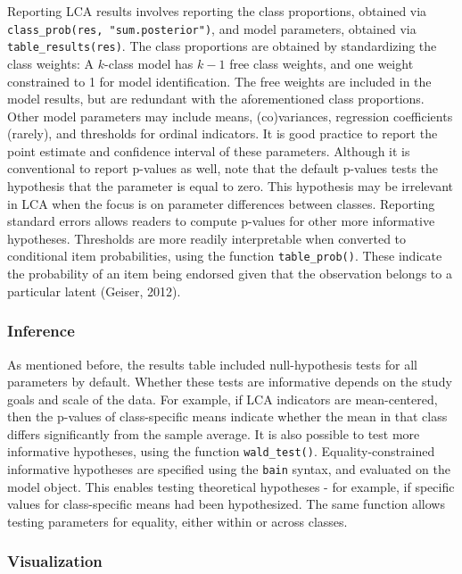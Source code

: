 \documentclass[
  ,man,floatsintext]{apa6}
\begin{document}
Reporting LCA results involves reporting the class proportions, obtained
via \texttt{class\_prob(res,\ "sum.posterior")}, and model parameters, obtained
via \texttt{table\_results(res)}. The class proportions are obtained by
standardizing the class weights: A \(k\)-class model has \(k-1\) free class
weights, and one weight constrained to 1 for model identification. The
free weights are included in the model results, but are redundant with
the aforementioned class proportions. Other model parameters may include
means, (co)variances, regression coefficients (rarely), and thresholds
for ordinal indicators. It is good practice to report the point estimate
and confidence interval of these parameters. Although it is conventional
to report p-values as well, note that the default p-values tests the
hypothesis that the parameter is equal to zero. This hypothesis may be
irrelevant in LCA when the focus is on parameter differences between
classes. Reporting standard errors allows readers to compute p-values
for other more informative hypotheses. Thresholds are more readily
interpretable when converted to conditional item probabilities, using
the function \texttt{table\_prob()}. These indicate the probability of an item
being endorsed given that the observation belongs to a particular latent
(Geiser, 2012).

\hypertarget{inference}{%
\subsubsection{Inference}\label{inference}}

As mentioned before, the results table included null-hypothesis tests
for all parameters by default. Whether these tests are informative
depends on the study goals and scale of the data. For example, if LCA
indicators are mean-centered, then the p-values of class-specific means
indicate whether the mean in that class differs significantly from the
sample average. It is also possible to test more informative hypotheses,
using the function \texttt{wald\_test()}. Equality-constrained informative
hypotheses are specified using the \texttt{bain} syntax, and evaluated on the
model object. This enables testing theoretical hypotheses - for example,
if specific values for class-specific means had been hypothesized. The
same function allows testing parameters for equality, either within or
across classes.

\hypertarget{visualization}{%
\subsubsection{Visualization}\label{visualization}}
\end{document}
